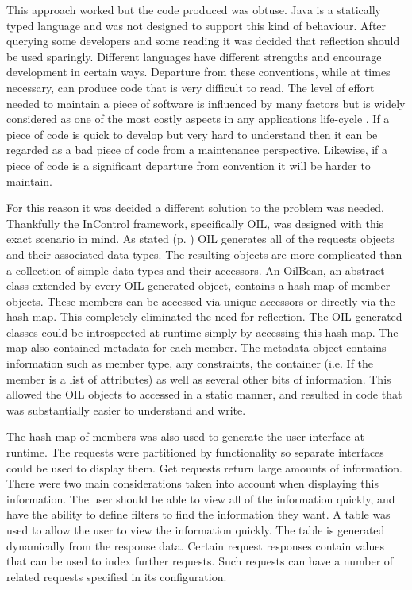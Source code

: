 \documentclass[a4paper, 11pt, titlepage]{article}
\begin{document}
This approach worked but the code produced was obtuse. Java is a statically typed language and was not designed to support this kind of behaviour. After querying some developers and some reading it was decided that reflection should be used sparingly. Different languages have different strengths and encourage development in certain ways. Departure from these conventions, while at times necessary, can produce code that is very difficult to read. The level of effort needed to maintain a piece of software is influenced by many factors \cite{cocomo} but is widely considered as one of the most costly aspects in any applications life-cycle \cite{software_maintenance} . If a piece of code is quick to develop but very hard to understand then it can be regarded as a bad piece of code from a maintenance perspective. Likewise, if a piece of code is a significant departure from convention it will be harder to maintain.

For this reason it was decided a different solution to the problem was needed. Thankfully the InControl framework, specifically OIL, was designed with this exact scenario in mind. As stated (p. \pageref{OILIntro}) OIL generates all of the requests objects and their associated data types. The resulting objects are more complicated than a collection of simple data types and their accessors. An OilBean, an abstract class extended by every OIL generated object, contains a hash-map of member objects. These members can be accessed via unique accessors or directly via the hash-map. This completely eliminated the need for reflection. The OIL generated classes could be introspected at runtime simply by accessing this hash-map. The map also contained metadata for each member. \label{metadata} The metadata object contains information such as member type, any constraints, the container (i.e. If the member is a list of attributes) as well as several other bits of information. This allowed the OIL objects to accessed in a static manner, and resulted in code that was substantially easier to understand and write.

The hash-map of members was also used to generate the user interface at runtime. The requests were partitioned by functionality so separate interfaces could be used to display them. Get requests return large amounts of information. There were two main considerations taken into account when displaying this information. The user should be able to view all of the information quickly, and have the ability to define filters to find the information they want. A table was used to allow the user to view the information quickly. The table is generated dynamically from the response data. Certain request responses contain values that can be used to index further requests. Such requests can have a number of related requests specified in its configuration.  
 
\end{document}

